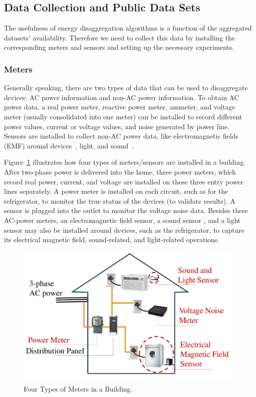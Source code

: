 \subsection{Data Collection  and Public Data Sets}
\label{sec:setup}
The usefulness of energy disaggregation algorithms is a function of the aggregated datasets' 
availability. 
Therefore we need to collect this data by installing the corresponding meters and 
sensors and setting up the necessary experiments. 

\subsubsection{Meters}
Generally speaking,
there are two types of data that can be used to disaggregate devices:
AC power information and non-AC power information.
To obtain AC power data, a real power meter, reactive power meter,
ammeter, and voltage meter (usually consolidated into one meter) can be installed to
record different power values, current or voltage values, 
and noise generated by power line.  
Sensors are installed to collect non-AC power data, like electromagnetic fields (EMF) 
around devices~\cite{giri_study_2012}, light, and sound~\cite{kim2009viridiscope}.

Figure~\ref{fig_metersConnection} illustrates how
four types of meters/sensors are installed in a building.
After two-phase power is delivered into the home, %
three power meters, which record real power,
current, and voltage are installed on
these three entry power lines separately. 
A power meter is installed on each circuit, such as for the refrigerator,
 to monitor the
true status of the devices (to validate results).
A sensor is plugged into the outlet to monitor the
voltage noise data.
Besides these AC-power meters,
an electromagnetic field sensor, 
a sound sensor , and a light sensor
may also be installed around devices,
such as the refrigerator, to capture its electrical magnetic field, 
sound-related, and light-related operations.

\begin{figure}[ht]
\centering
\includegraphics[width=3 in]{figs/metersConnection.pdf}
\caption{Four Types of Meters in a Building.}
\label{fig_metersConnection}
\end{figure}

